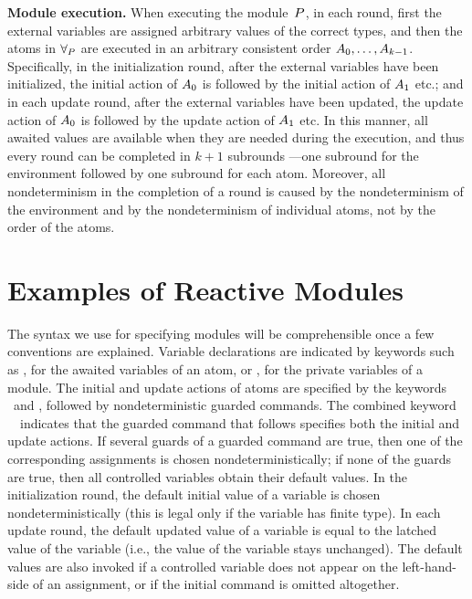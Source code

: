 \mypar
{\bf Module execution.}
When executing the module~${P}$, in each round, first the external variables
are assigned arbitrary values of the correct types, and then the atoms in
$\forall_{{P}}$ are executed in an arbitrary consistent order
$A_0,\ldots,A_{k-1}$.
Specifically, in the initialization round, after the external variables have
been initialized, the initial action of $A_0$ is followed by the initial
action of $A_1$ etc.;
and in each update round, after the external variables have been updated, the
update action of $A_0$ is followed by the update action of $A_1$ etc.
In this manner, all awaited values are available when they are needed during
the execution, and thus every round can be completed in $k+1$ subrounds
---one subround for the environment followed by one subround for each atom.
Moreover, all nondeterminism in the completion of a round is caused by the
nondeterminism of the environment and by the nondeterminism of individual
atoms, not by the order of the atoms.


\section{Examples of Reactive Modules}

The syntax we use for specifying modules will be comprehensible once a few
conventions are explained.
Variable declarations are indicated by keywords such as \AWAITS, for the
awaited variables of an atom, or \PRIV, for the private variables of a
module.
The initial and update actions of atoms are specified by the keywords \INIT\
and \UPDATE, followed by nondeterministic guarded commands.
The combined keyword \INIT\ \UPDATE\ indicates that the guarded command that
follows specifies both the initial and update actions.
If several guards of a guarded command are true, then one of the
corresponding assignments is chosen nondeterministically;
if none of the guards are true, then all controlled variables obtain their
default values.
In the initialization round, the default initial value of a variable is
chosen nondeterministically
(this is legal only if the variable has finite type).
In each update round, the default updated value of a variable is equal to the
latched value of the variable
(i.e., the value of the variable stays unchanged).
The default values are also invoked if a controlled variable does not appear
on the left-hand-side of an assignment, or if the initial command is omitted
altogether.

